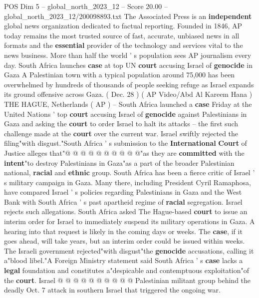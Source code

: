 \begin{textsample}{POS Dim 5 – global\_north\_2023\_12 – Score 20.00 – global\_north\_2023\_12/200098893.txt}  \label{ex:f5_pos_392}
The Associated Press is an \textbf{independent} global news organization dedicated to factual reporting.
Founded in 1846, AP today remains the most trusted source of fast, accurate, unbiased news in all formats and the \textbf{essential} provider of the technology and services vital to the news business.
More than half the world ' s population sees AP journalism every day.
South Africa launches \textbf{case} at top UN \textbf{court} accusing Israel of \textbf{genocide} in Gaza A Palestinian town with a typical population around 75,000 has been overwhelmed by hundreds of thousands of people seeking refuge as Israel expands its ground offensive across Gaza. ( Dec. 28 ) ( AP Video/Abd Al Kareem Hana ) THE HAGUE, Netherlands ( AP ) -- South Africa launched a \textbf{case} Friday at the United Nations ' top \textbf{court} accusing Israel of \textbf{genocide} against Palestinians in Gaza and asking the \textbf{court} to order Israel to halt its attacks -- the first such challenge made at the \textbf{court} over the current war.
Israel swiftly rejected the filing"with disgust."South Africa ' s submission to the \textbf{International} \textbf{Court} of Justice alleges that"@ @ @ @ @ @ @ @ @ @"as they are \textbf{committed} with the \textbf{intent}"to destroy Palestinians in Gaza"as a part of the broader Palestinian national, \textbf{racial} and \textbf{ethnic} group.
South Africa has been a fierce critic of Israel ' s military campaign in Gaza.
Many there, including President Cyril Ramaphosa, have compared Israel ' s policies regarding Palestinians in Gaza and the West Bank with South Africa ' s past apartheid regime of \textbf{racial} segregation.
Israel rejects such allegations.
South Africa asked The Hague-based \textbf{court} to issue an interim order for Israel to immediately suspend its military operations in Gaza.
A hearing into that request is likely in the coming days or weeks.
The \textbf{case}, if it goes ahead, will take years, but an interim order could be issued within weeks.
The Israeli government rejected"with disgust"the \textbf{genocide} accusations, calling it a"blood libel."A Foreign Ministry statement said South Africa ' s \textbf{case} lacks a \textbf{legal} foundation and constitutes a"despicable and contemptuous exploitation"of the \textbf{court}.
Israel @ @ @ @ @ @ @ @ @ @ Palestinian militant group behind the deadly Oct. 7 attack in southern Israel that triggered the ongoing war.

\end{textsample}
